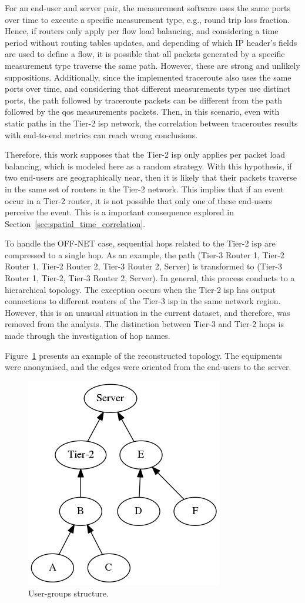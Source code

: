For an end-user and server pair,
the measurement software uses the same ports over time to execute a specific
measurement type, e.g., round trip loss fraction.
Hence, if routers only apply per flow load balancing,
and considering a time period without routing tables updates, and
depending of which IP header's fields are used to define a flow, it is possible
that all packets generated by a specific measurement type traverse the same
path. However, these are strong and unlikely suppositions.
Additionally, since the implemented traceroute also uses the same ports over
time, and considering that different measurements types use distinct ports,
the
path followed by traceroute packets can be different from the path followed by
the \gls*{qos} measurements packets. Then, in this scenario, even with static paths in
the Tier-2 \gls*{isp} network, the correlation between traceroutes
results with end-to-end metrics can reach wrong conclusions.

Therefore, this work supposes that the Tier-2 \gls*{isp} only applies per packet load
balancing, which is modeled here as a random strategy. With this hypothesis,
if two end-users are geographically near, then it is likely that their packets
traverse in the same set of routers in the Tier-2 network. This implies that if
an event occur in a Tier-2 router, it is not possible that only one of these
end-users perceive the event. This is a important consequence explored in
Section~\ref{sec:spatial_time_correlation}.

To handle the OFF-NET case, sequential hops related to
the Tier-2 \gls*{isp} are compressed to a single hop.
As an example, the path (Tier-3 Router 1, Tier-2 Router 1, Tier-2 Router 2,
Tier-3 Router 2, Server) is
transformed to (Tier-3 Router 1, Tier-2, Tier-3 Router 2, Server).
In general, this process conducts to a hierarchical topology.
The exception occurs when the Tier-2 \gls*{isp} has output connections to
different routers of the Tier-3 \gls*{isp} in the same network region.
However, this is an unusual situation in
the current dataset, and therefore, was removed from the analysis.
The distinction between
Tier-3 and Tier-2 hops is made through the investigation of hop names.

Figure~\ref{fig:real_graph} presents an example of the reconstructed
topology. The equipments were anonymised, and the edges were oriented from the
end-users to the server.

\begin{figure}[H]
    \centering
    \includegraphics[width=0.35\linewidth]{./figures/methodology/spatial_correlation/dtstart2016-05-01_dtend2016-05-11_NRIDTCLDM031_graph_anonymized.png}
    \caption{User-groups structure.}
\label{fig:real_graph}
\end{figure}%


